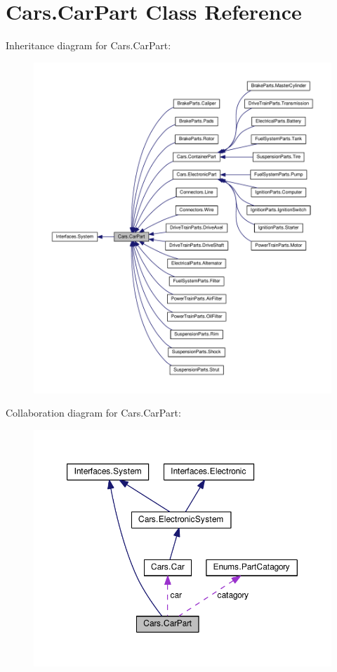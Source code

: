 \hypertarget{classCars_1_1CarPart}{}\section{Cars.\+Car\+Part Class Reference}
\label{classCars_1_1CarPart}


Inheritance diagram for Cars.\+Car\+Part\+:\nopagebreak
\begin{figure}[H]
\begin{center}
\leavevmode
\includegraphics[width=350pt]{classCars_1_1CarPart__inherit__graph}
\end{center}
\end{figure}


Collaboration diagram for Cars.\+Car\+Part\+:\nopagebreak
\begin{figure}[H]
\begin{center}
\leavevmode
\includegraphics[width=350pt]{classCars_1_1CarPart__coll__graph}
\end{center}
\end{figure}
